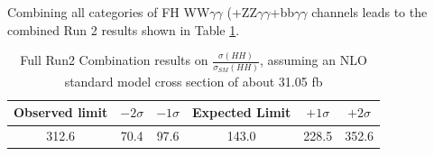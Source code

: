 Combining all categories of FH WW$\gamma\gamma$ (+ZZ$\gamma\gamma$+bb$\gamma \gamma$  channels leads to the combined Run 2 results shown in Table \ref{tab:Run2Results}.

\begin{table}[h!]
  \begin{center}
    \begin{tabular}{|c|ccccc|}
      \hline
         Observed limit & $-2\sigma$ & $-1\sigma$ & Expected Limit & $+1\sigma$ & $+2\sigma$ \\ \hline
          312.6  &   70.4 & 97.6 & 143.0 & 228.5 & 352.6   \\ \hline
          \end{tabular}
  \end{center}
  \caption{Full Run2 Combination results
  on $\frac{\sigma(HH)}{\sigma_{SM}(HH)}$, assuming an NLO standard model cross section of about 31.05 fb}
  \label{tab:Run2Results}
\end{table}  


